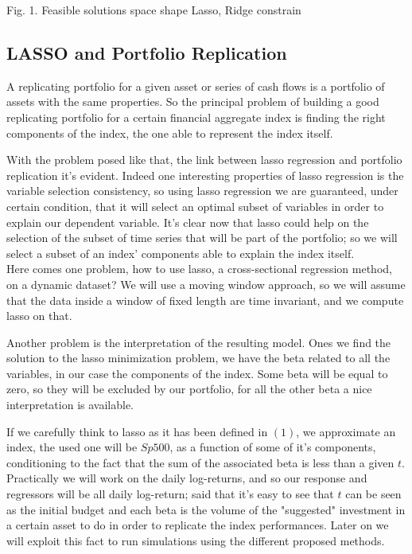 \documentclass{article}%
\begin{document}
\begin{center}
\begin{small}
Fig. 1. Feasible solutions space shape Lasso, Ridge constrain
\end{small}
\end{center}

\subsection{LASSO and Portfolio Replication}

A replicating portfolio for a given asset or series of cash flows is a portfolio of assets with the same properties. So the principal problem of building a good replicating portfolio for a certain financial aggregate index is finding the right components of the index, the one able to represent the index itself. 

With the problem posed like that, the link between lasso regression and portfolio replication it's evident. Indeed one interesting properties of lasso regression is the variable selection consistency, so using lasso regression we are guaranteed, under certain condition, that it will select an optimal subset of variables in order to explain our dependent variable. It's clear now that lasso could help on the selection of the subset of time series that will be part of the portfolio; so we will select a subset of an index' components  able to explain the index itself.
\\

Here comes one problem, how to use lasso, a cross-sectional regression method, on a dynamic dataset? We will use a moving window approach, so we will assume that the data inside a window of fixed length are time invariant, and we compute lasso on that.

Another problem is the interpretation of the resulting model. Ones we find the solution to the lasso minimization problem, we have the beta related to all the variables, in our case the components of the index. Some beta will be equal to zero, so they will be excluded by our portfolio, for all the other beta a nice interpretation is available. 

If we carefully think to lasso as it has been defined in $(1)$, we approximate an index, the used one will be $Sp500$, as a function of some of it's components, conditioning to the fact that the sum of the associated beta is less than a given $t$. Practically we will work on the daily log-returns, and so our response and regressors will be all daily log-return; said that it's easy to see that $t$ can be seen as the initial budget and each beta is the volume of the "suggested" investment in a certain asset to do in order to replicate the index performances. Later on we will exploit this fact to run simulations using the different proposed methods.
\end{document}

